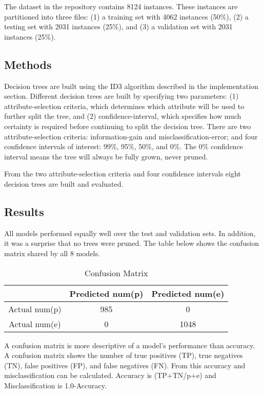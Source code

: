 \documentclass{IEEEtran}
\begin{document}
The dataset in the repository contains 8124 instances. These instances
are partitioned into three files: (1) a training set with 4062 instances
(50\%), (2) a testing set with 2031 instances (25\%), and (3) a
validation set with 2031 instances (25\%).

\subsection{Methods}
Decision trees are built using the ID3 algorithm described in the
implementation section. Different decision trees are built by
specifying two parameters: (1) attribute-selection criteria, which
determines which attribute will be used to further split the tree, and (2)
confidence-interval, which specifies how much certainty is required before
continuing to split the decision tree.  There are two
attribute-selection criteria: information-gain and
misclassification-error; and four confidence intervals of interest:
99\%,  95\%, 50\%, and 0\%. The 0\% confidence interval means the tree
will always be fully grown, never pruned.

From the two attribute-selection criteria and four confidence
intervals eight decision trees are built and evaluated.

\subsection{Results}
All models performed equally well over the test and validation
sets. In addition,  it was a surprise that no trees were pruned. The
table below shows the confusion matrix shared by all 8 models.

\begin{table}[ht]
  \caption{Confusion Matrix}
  \centering
  \begin{tabular}{c c c }
  \hline\hline
                & Predicted num(p) & Predicted num(e) \\ [0.5ex]
  \hline
  Actual num(p) &              985 &                0 \\
  Actual num(e) &                0 &             1048 \\ [1ex]
  \hline
  \end{tabular}
  \label{table:nonlin}
\end{table}

A confusion matrix is more descriptive of a model's performance than
accuracy. A confusion matrix shows the number of true positives (TP), true
negatives (TN), false positives (FP), and false negatives (FN). From this accuracy
and misclassification can be calculated. Accuracy is (TP+TN/p+e) and
Misclassification is 1.0-Accuracy.
\end{document}
